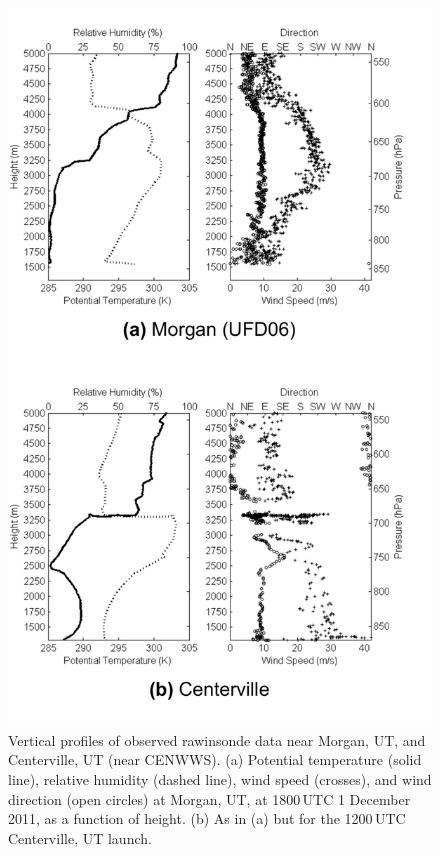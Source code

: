 \documentclass[pdftex,12pt]{article}
\begin{document}
\begin{figure}[t]
\centering
\includegraphics[width=27pc,angle=0]{sound_comp}
\caption{Vertical profiles of observed rawinsonde data near Morgan, UT, and Centerville, UT (near CENWWS). (a) Potential temperature (solid line), relative humidity (dashed line), wind speed (crosses), and wind direction (open circles) at Morgan, UT, at 1800\,UTC 1 December 2011, as a function of height. (b) As in (a) but for the 1200\,UTC Centerville, UT launch.}
\label{fig:sound}
\end{figure}
\end{document}
